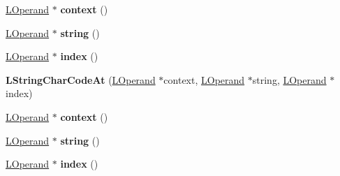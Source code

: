 \begin{DoxyCompactItemize}
\item 
\hyperlink{classv8_1_1internal_1_1_l_operand}{L\+Operand} $\ast$ {\bfseries context} ()\hypertarget{classv8_1_1internal_1_1_l_string_char_code_at_a9482271a8172ce48522512f232ac24aa}{}\label{classv8_1_1internal_1_1_l_string_char_code_at_a9482271a8172ce48522512f232ac24aa}

\item 
\hyperlink{classv8_1_1internal_1_1_l_operand}{L\+Operand} $\ast$ {\bfseries string} ()\hypertarget{classv8_1_1internal_1_1_l_string_char_code_at_a935ea67cb0997a56225d8943bd28acfc}{}\label{classv8_1_1internal_1_1_l_string_char_code_at_a935ea67cb0997a56225d8943bd28acfc}

\item 
\hyperlink{classv8_1_1internal_1_1_l_operand}{L\+Operand} $\ast$ {\bfseries index} ()\hypertarget{classv8_1_1internal_1_1_l_string_char_code_at_a6d34721abedba9af5cdca55a18b388c2}{}\label{classv8_1_1internal_1_1_l_string_char_code_at_a6d34721abedba9af5cdca55a18b388c2}

\item 
{\bfseries L\+String\+Char\+Code\+At} (\hyperlink{classv8_1_1internal_1_1_l_operand}{L\+Operand} $\ast$context, \hyperlink{classv8_1_1internal_1_1_l_operand}{L\+Operand} $\ast$string, \hyperlink{classv8_1_1internal_1_1_l_operand}{L\+Operand} $\ast$index)\hypertarget{classv8_1_1internal_1_1_l_string_char_code_at_a2ea27a024b27a329ff76364ab55c7cd1}{}\label{classv8_1_1internal_1_1_l_string_char_code_at_a2ea27a024b27a329ff76364ab55c7cd1}

\item 
\hyperlink{classv8_1_1internal_1_1_l_operand}{L\+Operand} $\ast$ {\bfseries context} ()\hypertarget{classv8_1_1internal_1_1_l_string_char_code_at_a9482271a8172ce48522512f232ac24aa}{}\label{classv8_1_1internal_1_1_l_string_char_code_at_a9482271a8172ce48522512f232ac24aa}

\item 
\hyperlink{classv8_1_1internal_1_1_l_operand}{L\+Operand} $\ast$ {\bfseries string} ()\hypertarget{classv8_1_1internal_1_1_l_string_char_code_at_a935ea67cb0997a56225d8943bd28acfc}{}\label{classv8_1_1internal_1_1_l_string_char_code_at_a935ea67cb0997a56225d8943bd28acfc}

\item 
\hyperlink{classv8_1_1internal_1_1_l_operand}{L\+Operand} $\ast$ {\bfseries index} ()\hypertarget{classv8_1_1internal_1_1_l_string_char_code_at_a6d34721abedba9af5cdca55a18b388c2}{}\label{classv8_1_1internal_1_1_l_string_char_code_at_a6d34721abedba9af5cdca55a18b388c2}


\end{DoxyCompactItemize}
